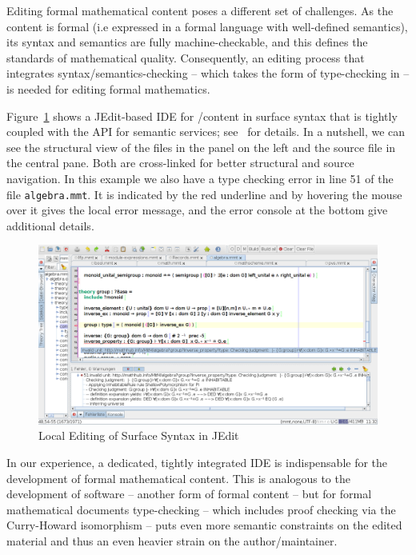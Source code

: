 Editing formal mathematical content poses a different set of challenges. As the content is
formal (i.e expressed in a formal language with well-defined semantics), its syntax and
semantics are fully machine-checkable, and this defines the standards of mathematical
quality. Consequently, an editing process that integrates syntax/semantics-checking --
which takes the form of type-checking in \mmt -- is needed for editing formal mathematics.

Figure~\ref{fig:jedit2} shows a JEdit-based IDE for \omdoc/\mmt content in \mmt surface
syntax that is tightly coupled with the \mmt API for semantic services;
see~\cite{Rabe:LII14} for details. In a nutshell, we can see the structural view of the
files in the panel on the left and the source file in the central pane. Both are
cross-linked for better structural and source navigation. In this example we also have a
type checking error in line 51 of the file \texttt{algebra.mmt}. It is indicated by the
red underline and by hovering the mouse over it gives the local error message, and the
error console at the bottom give additional details.

\begin{figure}[ht]\centering
  \includegraphics[width=\textwidth]{jedit2}
  \caption{Local Editing of \mmt Surface Syntax in JEdit}\label{fig:jedit2}
\end{figure}

In our experience, a dedicated, tightly integrated IDE is indispensable for the
development of formal mathematical content. This is analogous to the development of
software -- another form of formal content -- but for formal mathematical documents
type-checking -- which includes proof checking via the Curry-Howard isomorphism -- puts
even more semantic constraints on the edited material and thus an even heavier strain on
the author/maintainer.

